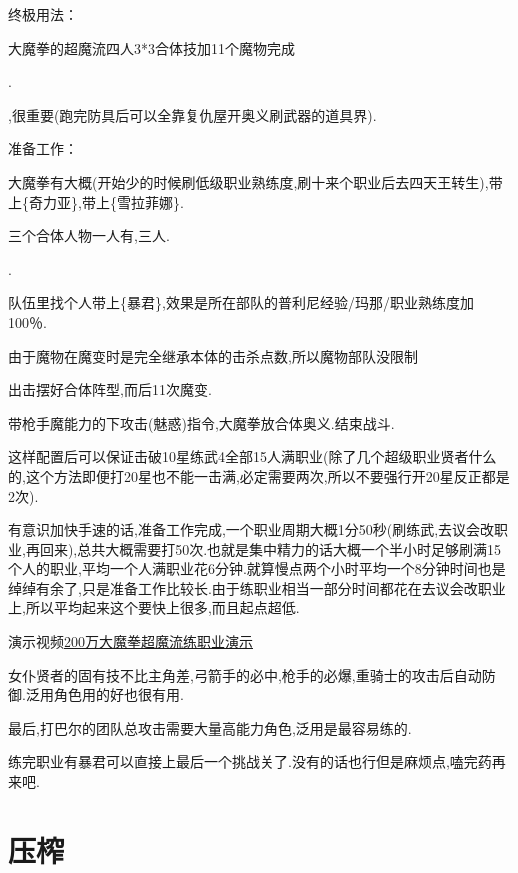 		终极用法：

		大魔拳的超魔流四人3*3合体技加11个魔物完成

		{\color{red}{修罗巴尔必备杰洛肯,有男主最好,需要大量千万级能力角色,所以这步可视为修罗巴尔攻略的必经之路}}.

		{\color{red}{记得练上魔女和兔兔莉亚,同步探索魔界收集41武器}},很重要(跑完防具后可以全靠复仇屋开奥义刷武器的道具界).

		准备工作：

		大魔拳有大概{\color{red}{200万能力}}(开始少的时候刷低级职业熟练度,刷十来个职业后去四天王转生),带上{\color{red}{[可靠的伙伴]}}\{奇力亚\},带上{\color{red}{生杀予夺}}\{雪拉菲娜\}.

		三个合体人物一人有{},三人{}.

		{\color{red}{四人放到普利尼部队}}.

		队伍里找个人带上{\color{red}{普利尼教育员}}\{暴君\},效果是所在部队的普利尼经验/玛那/职业熟练度加100％.

		由于魔物在魔变时是完全继承本体的击杀点数,所以魔物部队没限制

		出击摆好合体阵型,而后11次魔变.

		带枪手魔能力的下攻击(魅惑)指令,大魔拳放合体奥义.结束战斗.

		这样配置后可以保证击破10星练武4全部15人满职业(除了几个超级职业贤者什么的,这个方法即便打20星也不能一击满,必定需要两次,所以不要强行开20星反正都是2次).

		有意识加快手速的话,准备工作完成,一个职业周期大概1分50秒(刷练武,去议会改职业,再回来),总共大概需要打50次.也就是集中精力的话大概一个半小时足够刷满15个人的职业,平均一个人满职业花6分钟.就算慢点两个小时平均一个8分钟时间也是绰绰有余了,只是准备工作比较长.由于练职业相当一部分时间都花在去议会改职业上,所以平均起来这个要快上很多,而且起点超低.

		演示视频\href{http://www.bilibili.com/video/av2966618/}{200万大魔拳超魔流练职业演示}

		女仆贤者的固有技不比主角差,弓箭手的必中,枪手的必爆,重骑士的攻击后自动防御.泛用角色用的好也很有用.

		最后,打巴尔的团队总攻击需要大量高能力角色,泛用是最容易练的.

		练完职业有暴君可以直接上最后一个挑战关了.没有的话也行但是麻烦点,嗑完药再来吧.

	\newpage

	\section{压榨}

